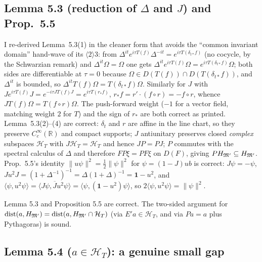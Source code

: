 \documentclass[11pt]{article}
\newcommand{\HT}{\mathcal H_T}
\newcommand{\ip}[2]{\langle#1,#2\rangle}
\newcommand{\norm}[1]{\lVert#1\rVert}
\newcommand{\dist}{\operatorname{dist}}
\newcommand{\HMp}{H_{\cM'}}
\newcommand{\one}{\mathbf 1}
\newcommand{\Om}{\Omega}
\begin{document}
\subsection{Lemma 5.3 (reduction of $\Delta$ and $J$) and Prop.\ 5.5}

I re-derived Lemma~5.3(1) in the cleaner form that avoids the ``common invariant domain'' hand-wave of its
$\langle2\rangle3$: from $\Delta^{it}e^{i\tau T(f)}\Delta^{-it}=e^{i\tau T(\delta_{t*}f)}$ (no cocycle, by
the Schwarzian remark) and $\Delta^{it}\Om=\Om$ one gets
$\Delta^{it}e^{i\tau T(f)}\Om=e^{i\tau T(\delta_{t*}f)}\Om$; both sides are differentiable at $\tau=0$
because $\Om\in D(T(f))\cap D(T(\delta_{t*}f))$, and $\Delta^{it}$ is bounded, so
$\Delta^{it}T(f)\Om=T(\delta_{t*}f)\Om$.  Similarly for $J$ with
$Je^{i\tau T(f)}J=e^{-i\tau JT(f)J}=e^{i\tau T(r_*f)}$, $r_*f=r'\cdot(f\circ r)=-f\circ r$, whence
$JT(f)\Om=T(f\circ r)\Om$.  The push-forward weight ($-1$ for a vector field, matching weight $2$ for $T$)
and the sign of $r_*$ are both correct as printed.
Lemma~5.3(2)--(4) are correct: $\delta_t$ and $r$ are affine in the line chart, so they preserve
$C^\infty_c(\mathbb R)$ and compact supports; $J$ antiunitary preserves closed \emph{complex} subspaces
$\HT$ with $J\HT=\HT$ and hence $JP=PJ$; $P$ commutes with the spectral calculus of $\Delta$ and therefore
$FP\xi=PF\xi$ on $D(F)$, giving $P\HMp\subseteq\HMp$.
Prop.~5.5's identity $\norm{u\psi}^2=\frac12\norm\psi^2$ for $\psi=(1-J)ub$ is correct:
$J\psi=-\psi$, $Ju^2J=(1+\Delta^{-1})^{-1}=\Delta(1+\Delta)^{-1}=\one-u^2$, and
$\ip\psi{u^2\psi}=\overline{\ip{J\psi}{Ju^2\psi}}=\ip\psi{(\one-u^2)\psi}$, so
$2\ip\psi{u^2\psi}=\norm\psi^2$.
\begin{verdictok}
Lemma 5.3 and Proposition 5.5 are correct.  The two-sided argument for
$\dist(a,\HMp)=\dist(a,\HMp\cap\HT)$ (via $E'a\in\HT$, and via $Pa=a$ plus Pythagoras) is sound.
\end{verdictok}

\subsection{Lemma 5.4 ($a\in\HT$): a genuine small gap}
\end{document}
